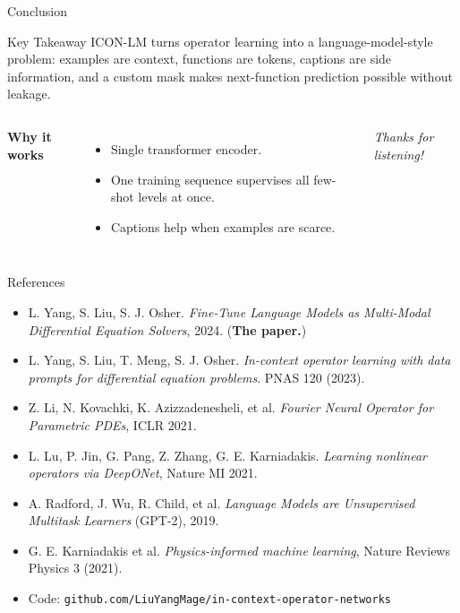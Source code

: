 \documentclass[10pt,aspectratio=169]{beamer}
\begin{document}
\begin{frame}{Conclusion}
  \begin{block}{Key Takeaway}
    ICON-LM turns operator learning into a language-model-style problem:
    examples are context, functions are tokens, captions are side information,
    and a custom mask makes next-function prediction possible without leakage.
  \end{block}
  \vspace{0.25em}
  \begin{columns}[T,onlytextwidth]
      \textbf{Why it works}
      \begin{itemize}\setlength\itemsep{0.18em}
        \item Single transformer encoder.
        \item One training sequence supervises all few-shot levels at once.
        \item Captions help when examples are scarce.
      \end{itemize}
      \vspace{2em}
      \begin{center}
        \large\textit{Thanks for listening!}
      \end{center}
  \end{columns}
\end{frame}

\begin{frame}{References}
  \footnotesize
  \begin{itemize}\setlength\itemsep{0.15em}
    \item L. Yang, S. Liu, S. J. Osher. \textit{Fine-Tune Language Models as Multi-Modal Differential Equation Solvers}, 2024. (\textbf{The paper.})
    \item L. Yang, S. Liu, T. Meng, S. J. Osher. \textit{In-context operator learning with data prompts for differential equation problems}. PNAS 120 (2023).
    \item Z. Li, N. Kovachki, K. Azizzadenesheli, et al. \textit{Fourier Neural Operator for Parametric PDEs}, ICLR 2021.
    \item L. Lu, P. Jin, G. Pang, Z. Zhang, G. E. Karniadakis. \textit{Learning nonlinear operators via DeepONet}, Nature MI 2021.
    \item A. Radford, J. Wu, R. Child, et al. \textit{Language Models are Unsupervised Multitask Learners} (GPT-2), 2019.
    \item G. E. Karniadakis et al. \textit{Physics-informed machine learning}, Nature Reviews Physics 3 (2021).
    \item Code: \texttt{github.com/LiuYangMage/in-context-operator-networks}
  \end{itemize}
\end{frame}
\end{document}
